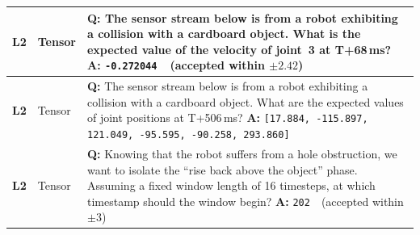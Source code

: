 \begin{small}
\begin{longtable}{@{}>{\raggedright\arraybackslash}p{}>{\raggedright\arraybackslash}p{}>{\raggedright\arraybackslash}p{}@{}}
        \textbf{L2}    & Tensor                 &
        \textbf{Q:} The sensor stream below is from a robot exhibiting a collision with a cardboard object. What is the expected value of the velocity of joint~3 at T+68\,ms? \newline
        \textbf{A:} \texttt{-0.272044}~~(accepted within $\pm2.42$)                                                                                                               \\
        \midrule

        \textbf{L2}    & Tensor                 &
        \textbf{Q:} The sensor stream below is from a robot exhibiting a collision with a cardboard object. What are the expected values of joint positions at T+506\,ms? \newline
        \textbf{A:} \texttt{[17.884, -115.897, 121.049, -95.595, -90.258, 293.860]}                                                                                               \\
        \midrule

        \textbf{L2}    & Tensor                 &
        \textbf{Q:} Knowing that the robot suffers from a hole obstruction, we want to isolate the ``rise back above the object'' phase. Assuming a fixed window length of 16 timesteps, at which timestamp should the window begin? \newline
        \textbf{A:} \texttt{202}~~(accepted within $\pm3$)                                                                                                                        \\
        \midrule


\end{longtable}
\end{small}
